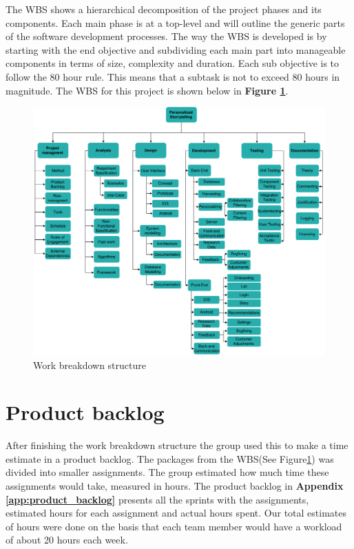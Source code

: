 The WBS shows a hierarchical decomposition of the project phases and its components. Each main phase is at a top-level and will outline the generic parts of the software development processes. The way the WBS is developed is by starting with the end objective and subdividing each main part into manageable components in terms of size, complexity and duration. Each sub objective is to follow the 80 hour rule. This means that a subtask is not to exceed 80 hours in magnitude. The WBS for this project is shown below in \textbf{Figure \ref{Fig:wbs}}. %

\begin{figure}[h!]
	\begin{center}
		\advance\leftskip-3cm
		\advance\rightskip-3cm
		\includegraphics[keepaspectratio=true,scale=0.43]{fig/wbs}
		\caption{Work breakdown structure}
		\label{Fig:wbs}
	\end{center}
\end{figure}

\section{Product backlog}
\label{sec:product_backlog}

After finishing the work breakdown structure the group used this to make a time estimate in a product backlog.
The packages from the WBS(See Figure\ref{Fig:wbs}) was divided into smaller assignments. The group estimated how much time these assignments would take, measured in hours. The product backlog in \textbf{Appendix \ref{app:product_backlog}}  presents all the sprints with the assignments, estimated hours for each assignment and actual hours spent. Our total estimates of hours were done on the basis that each team member would have a workload of about 20 hours each week.

